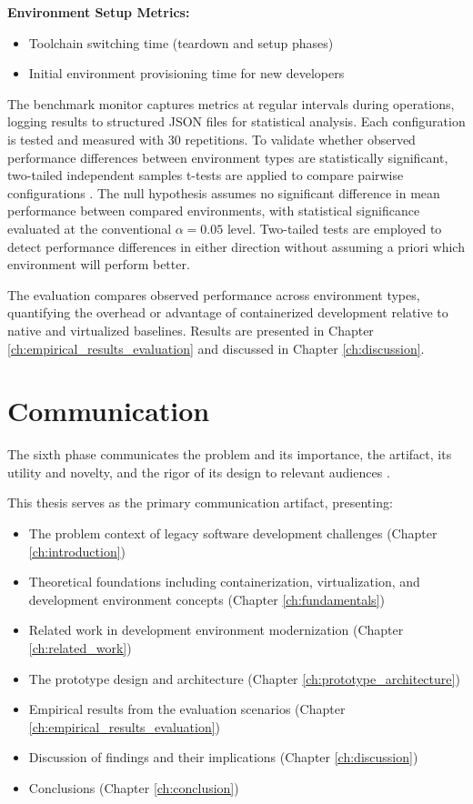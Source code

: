 \textbf{Environment Setup Metrics:}
\begin{itemize}
	\item Toolchain switching time (teardown and setup phases)
	\item Initial environment provisioning time for new developers
\end{itemize}

The benchmark monitor captures metrics at regular intervals during operations, logging results to structured JSON files for statistical analysis.
Each configuration is tested and measured with 30 repetitions.
To validate whether observed performance differences between environment types are statistically significant, two-tailed independent samples t-tests are applied to compare pairwise configurations \citep{montgomeryDesignAnalysisExperiments2017}.
The null hypothesis assumes no significant difference in mean performance between compared environments, with statistical significance evaluated at the conventional $\alpha = 0.05$ level.
Two-tailed tests are employed to detect performance differences in either direction without assuming a priori which environment will perform better.

The evaluation compares observed performance across environment types, quantifying the overhead or advantage of containerized development relative to native and virtualized baselines.
Results are presented in Chapter \ref{ch:empirical_results_evaluation} and discussed in Chapter \ref{ch:discussion}.

\section{Communication}

The sixth phase communicates the problem and its importance, the artifact, its utility and novelty, and the rigor of its design to relevant audiences \citep{peffersDesignScienceResearch2007}.

This thesis serves as the primary communication artifact, presenting:
\begin{itemize}
	\item The problem context of legacy software development challenges (Chapter \ref{ch:introduction})
	\item Theoretical foundations including containerization, virtualization, and development environment concepts (Chapter \ref{ch:fundamentals})
	\item Related work in development environment modernization (Chapter \ref{ch:related_work})
	\item The prototype design and architecture (Chapter \ref{ch:prototype_architecture})
	\item Empirical results from the evaluation scenarios (Chapter \ref{ch:empirical_results_evaluation})
	\item Discussion of findings and their implications (Chapter \ref{ch:discussion})
	\item Conclusions (Chapter \ref{ch:conclusion})
\end{itemize}

